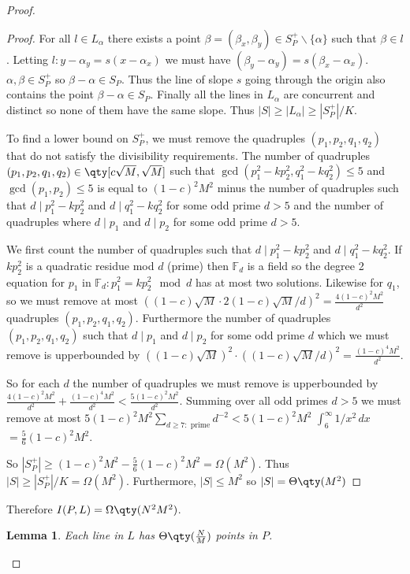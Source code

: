 \documentclass[11pt]{article}
\newtheorem{lemma}[theorem]{Lemma}
\newcommand{\FF}{\ensuremath{\mathbb F}}
\begin{document}
\begin{proof}
\begin{proof}
For all $l \in L_\alpha$ there exists a point $\beta = (\beta_x,\beta_y)  \in S_P^+ \backslash \{\alpha \}$ such that $\beta \in l$. Letting $l : y-\alpha_y= s(x -\alpha_x) $ we must have $(\beta_y - \alpha_y) = s(\beta_x -\alpha_x) $. $\alpha, \beta \in S_P^+$ so $\beta -\alpha \in S_P$. Thus the line of slope $s$ going through the origin also contains the point $\beta - \alpha \in S_P$. Finally all the lines in $L_\alpha$ are concurrent and distinct so none of them have the same slope. Thus $|S| \geq |L_\alpha|\geq |S_P^+|/K $. 

To find a lower bound on $S_P^+$, we must remove the quadruples $(p_1,p_2,q_1,q_2)$ that do not satisfy the divisibility requirements. The number of quadruples $(p_1,p_2,q_1,q_2) \in \qty[c \sqrt{M},\sqrt{M}]$ such that $\gcd(p_1^2-kp_2^2,q_1^2-kq_2^2) \leq 5$ and $\gcd(p_1,p_2) \leq 5$ is equal to $(1-c)^2 M^2$ minus the number of quadruples such that $d \mid p_1^2-kp_2^2$ and $d \mid q_1^2-kq_2^2$ for some odd prime $d > 5$ and the number of quadruples where $d \mid p_1$ and $d \mid p_2$ for some odd prime $d > 5$. 

We first count the number of quadruples such that $d \mid p_1^2-kp_2^2$ and $d \mid q_1^2-kq_2^2$. If $kp_2^2$ is a quadratic residue mod $d$ (prime) then $\FF_d$ is a field so the degree 2 equation for $p_1$ in $\FF_d: p_1^2=kp_2^2 \mod d$ has at most two solutions. Likewise for $q_1$, so we must remove at most $( (1-c)\sqrt{M} \cdot 2(1-c)\sqrt{M}/d)^2 = \frac{4(1-c)^2 M^2}{d^2}$ quadruples $(p_1,p_2,q_1,q_2)$. Furthermore the number of quadruples $(p_1,p_2,q_1,q_2)$ such that $d \mid p_1$ and $d \mid p_2$ for some odd prime $d$ which we must remove is upperbounded by $((1-c)\sqrt{M})^2 \cdot ((1-c)\sqrt{M}/d)^2 = \frac{(1-c)^4 M^2}{d^2}$. 

So for each $d$ the number of quadruples we must remove is upperbounded by $\frac{4(1-c)^2 M^2}{d^2} + \frac{(1-c)^4 M^2}{d^2} < \frac{5(1-c)^2 M^2}{d^2}$. Summing over all odd primes $d>5$ we must remove at most $5(1-c)^2 M^2 \sum_{d\geq 7 : \text{ prime}} d^{-2}< 5(1-c)^2 M^2$ \(\int_{6}^{\infty} 1/x^2 \,dx\) $=\frac{5}{6} (1-c)^2 M^2$. 

So $|S_P^+| \geq (1-c)^2 M^2 - \frac{5}{6} (1-c)^2 M^2 = \Omega(M^2)$. Thus $|S| \geq |S_P^+|/K = \Omega(M^2)$. Furthermore, $|S| \leq M^2$ so $|S|=\Theta\qty(M^2)$
\end{proof}

Therefore $I(P,L)= \Omega\qty(N^2 M^2)$.

\begin{lemma}
    Each line in $L$ has $\Theta\qty(\frac{N}{M})$ points in $P$.
\end{lemma}


\end{proof}
\end{document}
